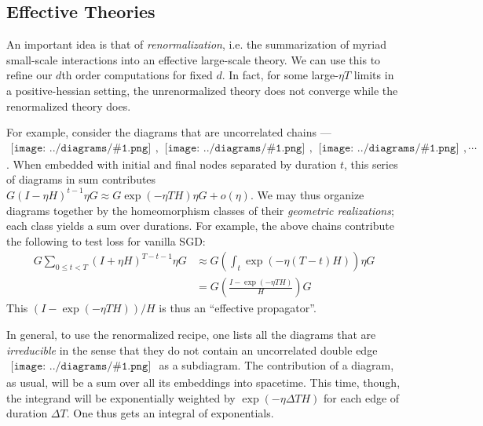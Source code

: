 \documentclass{article}
\newcommand{\wrap}[1]{\left(#1\right)}
\newcommand{\sdia}[1]{\begin{gathered}\texttt{[image: ../diagrams/\#1.png]}\end{gathered}}
\begin{document}

    \subsection{Effective Theories}
        An important idea is that of \emph{renormalization}, i.e. the
        summarization of myriad small-scale interactions into an effective
        large-scale theory.  We can use this to refine our $d$th order
        computations for fixed $d$.  In fact, for some large-$\eta T$ limits
        in a positive-hessian setting, the unrenormalized theory does not
        converge while the renormalized theory does.

        For example, consider the diagrams that are uncorrelated chains ---
        $\sdia{(0-1)(01)}, \sdia{(0-1-2)(01-12)},
        \sdia{(0-1-2-3)(01-12-23)}, \cdots$.  When embedded with initial and
        final nodes separated by duration $t$, this series of diagrams in sum
        contributes
        $
            G (I-\eta H)^{t-1} \eta G
            \approx
            G \exp(-\eta T H) \eta G
            +
            o(\eta)
        $.
        We may thus organize diagrams together by the homeomorphism classes of
        their \emph{geometric realizations}; each class yields a sum over
        durations.  For example, the above chains contribute the following to
        test loss for vanilla SGD:
        \begin{align*}
            G \sum_{0\leq t<T} (I+\eta H)^{T-t-1} \eta G
            &\approx
            G \wrap{\int_t \exp(-\eta (T-t) H)} \eta G\\
            &=
            G \wrap{\frac{I - \exp(-\eta T H)}{H}} G
        \end{align*}
        This 
        $
            \wrap{I - \exp(-\eta T H)}/H
        $
        is thus an ``effective propagator''.

        In general, to use the renormalized recipe, one lists all the diagrams
        that are \emph{irreducible} in the sense that they do not contain an
        uncorrelated double edge $\sdia{(0-1-2)(01-12)}$ as a subdiagram. 
        The contribution of a diagram, as usual, will be a sum over all its
        embeddings into spacetime.  This time, though, the integrand will be
        exponentially weighted by $\exp(-\eta \Delta T H)$ for each edge of
        duration $\Delta T$.  One thus gets an integral of exponentials.
\end{document}
